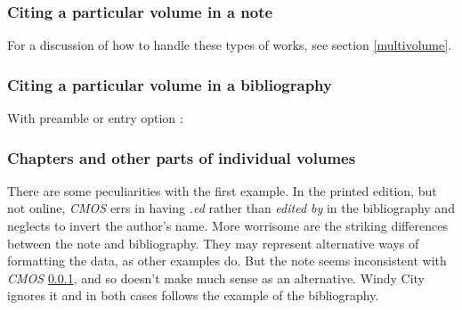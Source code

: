 \documentclass[11pt,letterpaper,oneside]{article}
\begin{document}
\subsubsection{Citing a particular volume in a note}
\label{14.118}

For a discussion of how to handle these types of works, see section
\ref{multivolume}.

\begin{citebib}
\item \cite[4:243]{byrne1981}
\item \cite*[32--33]{james1963.5}
\item \cite[4:245]{byrne1981}
\item \cite*[34]{james1963.5}
\end{citebib}

\subsubsection{Citing a particular volume in a bibliography}
\label{14.119}

\begin{citebib}
\item \cite{armstrong2014}
\end{citebib}

\noindent With preamble or entry option :

\begin{citebib}
\item \cite{armstrong2014}
\end{citebib}

\subsubsection{Chapters and other parts of individual volumes}
\label{14.120}

There are some peculiarities with the first example. In the printed
edition, but not online, \textit{CMOS} errs in having \textit{.ed}
rather than \textit{edited by} in the bibliography and neglects to
invert the author's name. More worrisome are the striking differences
between the note and bibliography. They may represent alternative ways
of formatting the data, as other examples do. But the note seems
inconsistent with \textit{CMOS} \ref{14.118}, and so doesn't make much
sense as an alternative. Windy City ignores it and in both cases
follows the example of the bibliography.
\end{document}
